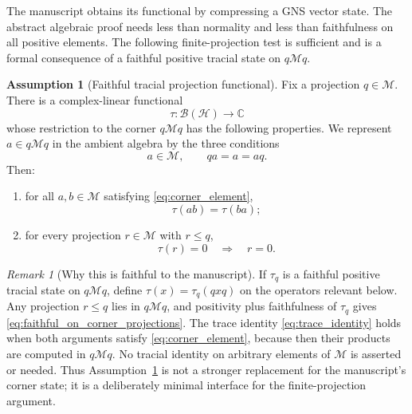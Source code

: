 \documentclass[11pt,reqno]{amsart}
\numberwithin{equation}{section}
\theoremstyle{definition}
\newtheorem{assumption}[theorem]{Assumption}
\theoremstyle{remark}
\newtheorem{remark}[theorem]{Remark}
\newcommand{\cB}{\mathcal B}
\newcommand{\cH}{\mathcal H}
\newcommand{\cM}{\mathcal M}
\begin{document}
The manuscript obtains its functional by compressing a GNS vector state.  The
abstract algebraic proof needs less than normality and less than faithfulness
on all positive elements.  The following finite-projection test is sufficient
and is a formal consequence of a faithful positive tracial state on $q\cM q$.

\begin{assumption}[Faithful tracial projection functional]
\label{ass:faithful_tracial_projection_functional}
Fix a projection $q\in\cM$.  There is a complex-linear functional
\begin{equation}
  \tau:\cB(\cH)\longrightarrow\mathbb C
  \label{eq:trace_functional}
\end{equation}
whose restriction to the corner $q\cM q$ has the following properties.  We
represent $a\in q\cM q$ in the ambient algebra by the three conditions
\begin{equation}
  a\in\cM,
  \qquad
  qa=a=aq.
  \label{eq:corner_element}
\end{equation}
Then:
\begin{enumerate}[label=\textup{(T\arabic*)},leftmargin=3em]
  \item for all $a,b\in\cM$ satisfying \eqref{eq:corner_element},
  \begin{equation}
    \tau(ab)=\tau(ba);
    \label{eq:trace_identity}
  \end{equation}
  \item for every projection $r\in\cM$ with $r\leq q$,
  \begin{equation}
    \tau(r)=0
    \quad\Longrightarrow\quad
    r=0.
    \label{eq:faithful_on_corner_projections}
  \end{equation}
\end{enumerate}
\end{assumption}

\begin{remark}[Why this is faithful to the manuscript]
\label{rem:faithful_state_implies_assumption}
If $\tau_q$ is a faithful positive tracial state on $q\cM q$, define
$\tau(x)=\tau_q(qxq)$ on the operators relevant below.  Any projection
$r\leq q$ lies in $q\cM q$, and positivity plus faithfulness of $\tau_q$
gives \eqref{eq:faithful_on_corner_projections}.  The trace identity
\eqref{eq:trace_identity} holds when both arguments satisfy
\eqref{eq:corner_element}, because then their products are computed in
$q\cM q$.  No tracial identity on arbitrary elements of $\cM$ is asserted or
needed.  Thus
Assumption~\ref{ass:faithful_tracial_projection_functional} is not a stronger
replacement for the manuscript's corner state; it is a deliberately minimal
interface for the finite-projection argument.
\end{remark}
\end{document}
